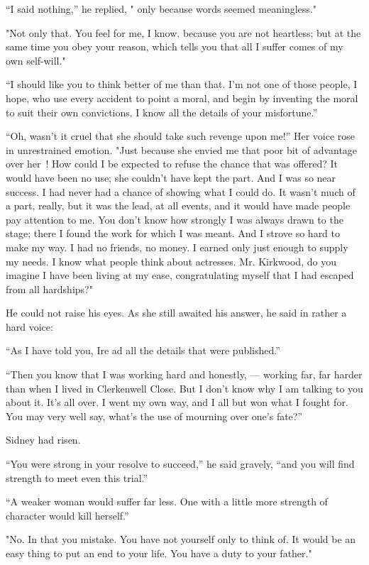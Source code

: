``I said nothing,'' he replied, " only because words seemed
meaningless."

"Not only that. You feel for me, I know. {\protect\hypertarget{85}{}{}}
because you are not heartless; but at the same time you obey your
reason, which tells you that all I suffer comes of my own self-will."

``I should like you to think better of me than that. I'm not one of
those people, I hope, who use every accident to point a moral, and begin
by inventing the moral to suit their own convictions. I know all the
details of your misfortune.''

``Oh, wasn't it cruel that she should take such revenge upon me!'' Her
voice rose in unrestrained emotion. "Just because she envied me that
poor bit of advantage over her~! How could I be expected to refuse the
chance that was offered? It would have been no use; she couldn't have
kept the part. And I was so near success. I had never had a chance of
showing what I could do. It wasn't much of a part, really, but it was
the lead, at all events, and it would have made people pay attention to
me. You don't know how strongly I was always drawn to the stage; there I
found the work for which I was meant. And I strove so hard to make my
way. I had no friends, no money. I earned only just enough to supply my
needs. I know what {\protect\hypertarget{86}{}{}} people think about
actresses. Mr. Kirkwood, do you imagine I have been living at my ease,
congratulating myself that I had escaped from all hardships?"

He could not raise his eyes. As she still awaited his answer, he said in
rather a hard voice:

``As I have told you, Ire ad all the details that were published.''

``Then you know that I was working hard and honestly, --- working far,
far harder than when I lived in Clerkenwell Close. But I don't know why
I am talking to you about it. It's all over. I went my own way, and I
all but won what I fought for. You may very well say, what's the use of
mourning over one's fate?''

Sidney had risen.

``You were strong in your resolve to succeed,'' he said gravely, ``and
you will find strength to meet even this trial.''

``A weaker woman would suffer far less. One with a little more strength
of character would kill herself.''

"No. In that you mistake. You have not yourself only to think of. It
would be an {\protect\hypertarget{87}{}{}} easy thing to put an end to
your life. You have a duty to your father."

